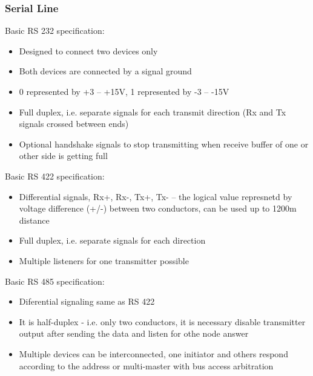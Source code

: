 \documentclass{beamer}
\begin{document}
\begin{frame}[shrink=5]
\frametitle{Serial Line}

Basic RS 232 specification:
\begin{itemize}
\item Designed to connect two devices only
\item Both devices are connected by a signal ground
\item 0 represented by +3 -- +15V, 1 represented by -3 -- -15V
\item Full duplex, i.e. separate signals for each transmit direction (Rx and Tx signals crossed between ends)
\item Optional handshake signals to stop transmitting when receive buffer of one or other side is getting full
\end{itemize}

Basic RS 422 specification:
\begin{itemize}
\item Differential signals, Rx+, Rx-, Tx+, Tx- -- the logical value represnetd by voltage difference (+/-) between two conductors, can be used up to 1200m distance
\item Full duplex, i.e. separate signals for each direction
\item Multiple listeners for one transmitter possible
\end{itemize}

Basic RS 485 specification:
\begin{itemize}
\item Diferential signaling same as RS 422
\item It is half-duplex - i.e. only two conductors, it is necessary disable transmitter output after sending the data and listen for othe node answer
\item Multiple devices can be interconnected, one initiator and others respond according to the address or multi-master with bus access arbitration
\end{itemize}

\end{frame}
\end{document}

